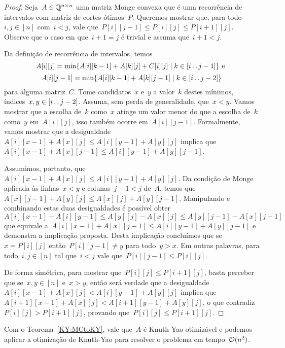 \begin{proof}
Seja~$A \in \mathbb{Q}^{n \times n}$ uma matriz Monge convexa que é uma recorrência de intervalos com matriz de cortes ótimos~$P$. Queremos mostrar que, para todo~$i,j \in [n]$ com~$i < j$, vale que~${P[i][j-1] \leq P[i][j] \leq P[i+1][j]}$. Observe que o caso em que~${i + 1 = j}$ é trivial e assuma que~${i + 1 < j}$.

Da definição de recorrência de intervalos, temos
$$ A[i][j] = \min\{ A[i][k-1] + A[k][j] + C[i][j] \mid k \in [i \,.\,.\, j - 1] \} \text{ e } $$
$$ A[i][j-1] = \min\{ A[i][k-1] + A[k][j-1] \mid k \in [i \,.\,.\, j-2] \} $$
para alguma matriz~$C$. Tome candidatos~$x$ e~$y$ a valor~$k$ destes mínimos, índices~${x,y \in [i \,.\,.\, j-2] }$. Assuma, sem perda de generalidade, que~$x < y$. Vamos mostrar que a escolha de~$k$ como~$x$ atinge um valor menor do que a escolha de~$k$ como~$y$ em~$A[i][j]$, isso também ocorre em~${ A[i][j-1] }$. Formalmente, vamos mostrar que a desigualdade~${ A[i][x-1] + A[x][j] \leq A[i][y-1] + A[y][j] }$ implica que~${ A[i][x-1] + A[x][j-1] \leq A[i][y-1] + A[y][j-1] }$.

Assumimos, portanto, que~$A[i][x-1] + A[x][j] \leq A[i][y-1] + A[y][j]$. Da condição de Monge aplicada às linhas~${ x < y }$ e colunas~${ j - 1 < j }$ de~$A$, temos que~${ A[x][j-1] + A[y][j] \leq A[x][j] + A[y][j-1] }$. Manipulando e combinando estas duas desigualdades é possível obter
$$ A[i][x-1] - A[i][y-1] \leq A[y][j] - A[x][j] \leq A[y][j-1] - A[x][j-1] $$
que equivale a~${ A[i][x-1] + A[x][j-1] \leq A[i][y-1] + A[y][j-1] }$ e demonstra a implicação proposta. Desta implicação concluímos que se~$x = P[i][j]$ então~$P[i][j-1] \neq y$ para todo~$y > x$. Em outras palavras, para todo~$i,j \in [n]$ tal que~$i < j$ vale que~$P[i][j-1] \leq P[i][j]$.

De forma simétrica, para mostrar que~${P[i][j] \leq P[i+1][j]}$, basta perceber que se~${x,y \in [n]}$ e~${x > y}$, então será verdade que a desigualdade~${A[i][x-1] + A[x][j] < A[i][y-1] + A[y][j]}$ implica que~${A[i+1][x-1] + A[x][j] < A[i+1][y-1] + A[y][j]}$, o que contradiz~${P[i][j] > P[i+1][j]}$, provando que~${P[i][j] \leq P[i+1][j]}$.
\end{proof}

Com o Teorema~\ref{KY:MCtoKY}, vale que~$A$ é Knuth-Yao otimizável e podemos aplicar a otimização de Knuth-Yao para resolver o problema em tempo~$\mathcal{O}(n^2)$.
